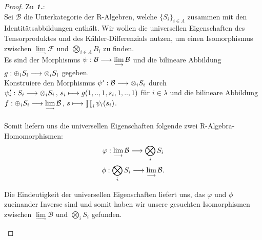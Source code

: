 \documentclass[10pt,a4paper]{report}
\newcommand{\functionfront}[3]{\nolinebreak{#1:#2 \longrightarrow #3}}
\newcommand{\function}[5]{\nolinebreak{#1:#2 \longrightarrow #3 \, , \, #4 \longmapsto #5}}
\newcommand{\colimes}[0]{\lim\limits_{ \longrightarrow }}
\begin{document}
\begin{proof}
Zu \textit{\textbf{1.}}:\\
Sei $\mathcal{B}$ die Unterkategorie der R-Algebren, welche $\lbrace S_i \rbrace_{i \in \Lambda}$ zusammen mit den Identitätsabbildungen enthält. Wir wollen die universellen Eigenschaften des Tensorproduktes und des Kähler-Differenzials nutzen, um einen Isomorphismus zwischen $\colimes \mathcal{F}$ und $\bigotimes_{i \in \Lambda} B_i$ zu finden.\\ 
Es sind der Morphismus $\functionfront{\psi}{\mathcal{B}}{\colimes \mathcal{B}}$ und die bilineare Abbildung $\functionfront{g}{\oplus_i S_i}{\otimes_i S_i}$ gegeben.\\
Konstruiere den Morphismus $\functionfront{\psi'}{\mathcal{B}}{\otimes_i S_i}$ durch $\function{\psi'_i}{S_i}{\otimes_i S_i}{s_i}{g(1,..,1,s_i,1,..,1)}$ für $i \in \lambda$ und die bilineare Abbildung $\function{f}{\oplus_i S_i}{\colimes \mathcal{B}}{s}{\prod_i \psi_i(s_i)}$.\\
\ \\
Somit liefern uns die universellen Eigenschaften folgende zwei R-Algebra-Homomorphismen:
\begin{gather*}
\functionfront{\varphi}{\colimes \mathcal{B}}{\bigotimes_i S_i} \\
\functionfront{\phi}{\bigotimes_i S_i}{\colimes \mathcal{B}}.
\end{gather*}
\begin{center}
\end{center}
Die Eindeutigkeit der universellen Eigenschaften liefert uns, das $\varphi$ und $\phi$ zueinander Inverse sind und somit haben wir unsere gesuchten Isomorphismen zwischen $\colimes \mathcal{B}$ und $\bigotimes_i S_i$ gefunden.
\begin{center}
\end{center}
\end{proof}
\end{document}

